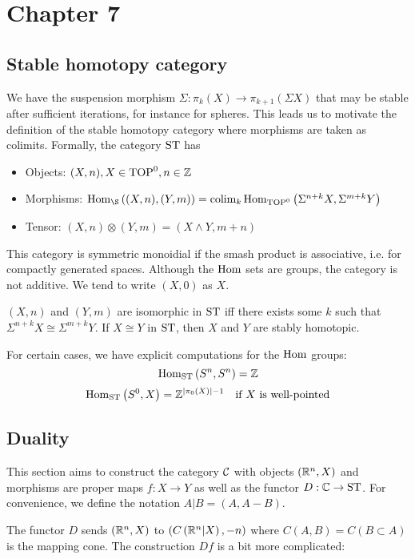 \section{Chapter 7}

\subsection{Stable homotopy category}

We have the suspension morphism $\Sigma:\pi_k(X)\to\pi_{k+1}(\Sigma X)$ that may be stable after sufficient iterations, for instance for spheres. This leads us to motivate the definition of the stable homotopy category where morphisms are taken as colimits. Formally, the category $\operatorname{ST}$ has
\begin{itemize}
    \item Objects: $(X,n),X\in\operatorname{TOP}^0,n\in\mathbb Z$
    \item Morphisms: $\Hom_\S\left((X,n),(Y,m)\right)=\colim_k\Hom_{\TOP^0}\left(\Sigma^{n+k}X,\Sigma^{m+k}Y\right)$
    \item Tensor: $(X,n)\otimes(Y,m)=(X\wedge Y,m+n)$
\end{itemize}
This category is symmetric monoidial if the smash product is associative, i.e. for compactly generated spaces. Although the $\operatorname{Hom}$ sets are groups, the category is not additive. We tend to write $(X,0)$ as $X$.

$(X,n)$ and $(Y,m)$ are isomorphic in $\operatorname{ST}$ iff there exists some $k$ such that $\Sigma^{n+k}X\cong\Sigma^{m+k}Y$. If $X\cong Y$ in $\operatorname{ST}$, then $X$ and $Y$ are stably homotopic.

For certain cases, we have explicit computations for the $\operatorname{Hom}$ groups:
\[\operatorname{Hom}_{\operatorname{ST}}\left(S^n,S^n\right)=\mathbb Z\]
\[\operatorname{Hom}_{\operatorname{ST}}\left(S^0,X\right)=\mathbb Z^{\left|\pi_0(X)\right|-1}\quad\text{if $X$ is well-pointed}\]

\subsection{Duality}

This section aims to construct the category $\mathcal C$ with objects $\left(\mathbb R^n,X\right)$ and morphisms are proper maps $f:X\to Y$ as well as the functor $D:\mathbb C\to\operatorname{ST}$. For convenience, we define the notation $A|B=(A,A-B)$.

The functor $D$ sends $\left(\mathbb R^n,X\right)$ to $\left(C\left(\mathbb R^n|X\right),-n\right)$ where $C(A,B)=C(B\subset A)$ is the mapping cone. The construction $Df$ is a bit more complicated:

